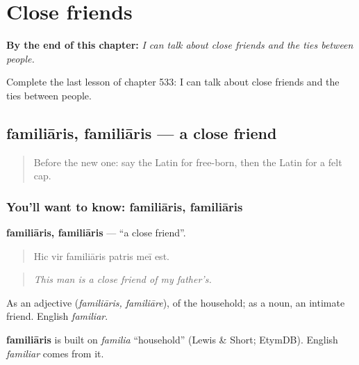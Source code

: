 
\chapter{Close friends}
\label{ch:la-close-friends}

\begin{chapteropening}
\textbf{By the end of this chapter:} \emph{I can talk about close friends and the ties between people.}

Complete the last lesson of chapter 533: I can talk about close friends and the ties between people.
\end{chapteropening}

\section[familiāris, familiāris]{familiāris, familiāris — a close friend}

\label{lesson:LA-C533-familiaris}



\begin{quote}
Before the new one: say the Latin for free-born, then the Latin for a felt cap.
\end{quote}

\subsection*{You'll want to know: familiāris, familiāris}
\textbf{familiāris, familiāris} — \textquotedblleft{}a close friend\textquotedblright{}.

\begin{quote}
Hic vir familiāris patris meī est.
\end{quote}

\begin{quote}
\emph{This man is a close friend of my father's.}
\end{quote}

As an adjective (\emph{familiāris, familiāre}), of the household; as a noun, an intimate friend. English \emph{familiar}.

\begin{cousinweb}
\textbf{familiāris} is built on \emph{familia} \textquotedblleft{}household\textquotedblright{} (Lewis \& Short; EtymDB). English \emph{familiar} comes from it.
\end{cousinweb}

